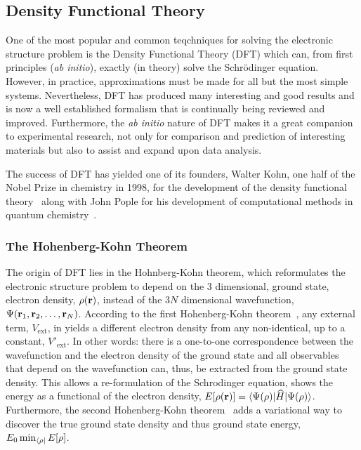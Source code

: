 \subsection{Density Functional Theory}
\label{sec:methods-dft}
One of the most popular and common teqchniques for solving the electronic structure problem is the Density Functional Theory (DFT) which can, from first principles (\textit{ab initio}), exactly (in theory) solve the Schr\"odinger equation.
However, in practice, approximations must be made for all but the most simple systems.
Nevertheless, DFT has produced many interesting and good results and is now a well established formalism that is continually being reviewed and improved.
Furthermore, the \textit{ab initio} nature of DFT makes it a great companion to experimental research, not only for comparison and prediction of interesting materials but also to assist and expand upon data analysis.

The success of DFT has yielded one of its founders, Walter Kohn, one half of the Nobel Prize in chemistry in 1998, for the development of the density functional theory~\cite{kohn1999} along with John Pople for his development of computational methods in quantum chemistry~\cite{pople1999}.

\subsubsection{The Hohenberg-Kohn Theorem}
The origin  of DFT lies in the Hohnberg-Kohn theorem, which reformulates the electronic structure problem to depend on the $3$ dimensional, ground state, electron density, $\rho({\mathrm{\mathbf{\bm{r}}}})$, instead of the $3N$ dimensional wavefunction, $\Psi({\mathrm{\mathbf{\bm{r}}}}_1, {\mathrm{\mathbf{\bm{r}}}}_2, \ldots, {\mathrm{\mathbf{\bm{r}}}}_N)$.
According to the first Hohenberg-Kohn theorem~\cite{hohenberg-kohn-1964}, any external term, $V_\text{ext}$, in  yields a different electron density from any non-identical, up to a constant, $V'_\text{ext}$.
In other words: there is a one-to-one correspondence between the wavefunction and the electron density of the ground state and all observables that depend on the wavefunction can, thus, be extracted from the ground state density.
This allows a re-formulation of the Schrodinger equation, shows the energy as a functional of the electron density, $E[\rho({\mathrm{\mathbf{\bm{r}}}})] = \langle \Psi(\rho) | \widehat{H} | \Psi(\rho) \rangle$. 
Furthermore, the second Hohenberg-Kohn theorem~\cite{hohenberg-kohn-1964} adds a variational way to discover the true ground state density and thus ground state energy, $E_0 \min_{\langle \rho|} E[\rho]$.

